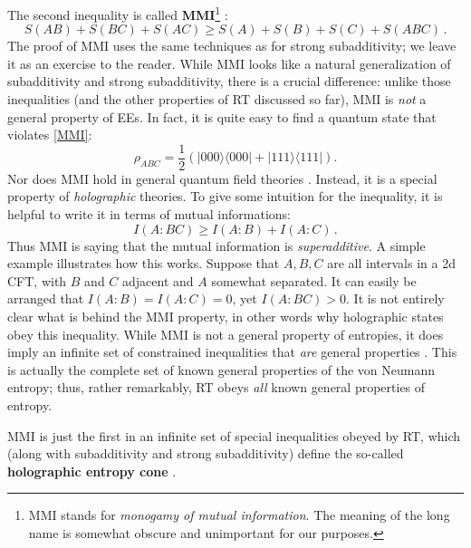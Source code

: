 \documentclass[11pt]{article}
\newcommand{\ket}[1]{|{#1}\rangle}
\newcommand{\bra}[1]{\langle{#1}|}
\begin{document}
The second inequality is called \textbf{MMI}\footnote{MMI stands for \emph{monogamy of mutual information}. The meaning of the long name is somewhat obscure and unimportant for our purposes.} \cite{Hayden:2011ag}:
\begin{equation}\label{MMI}
S(AB)+S(BC)+S(AC)\ge S(A)+S(B)+S(C)+S(ABC)\,.
\end{equation}
The proof of MMI uses the same techniques as for strong subadditivity; we leave it as an exercise to the reader. While MMI looks like a natural generalization of subadditivity and strong subadditivity, there is a crucial difference: unlike those inequalities (and the other properties of RT discussed so far), MMI is \emph{not} a general property of EEs. In fact, it is quite easy to find a quantum state that violates \eqref{MMI}:
\begin{equation}
\rho_{ABC} = \frac12\left(\ket{000}\bra{000}+\ket{111}\bra{111}\right).
\end{equation}
Nor does MMI hold in general quantum field theories \cite{Casini:2008wt}. Instead, it is a special property of \emph{holographic} theories. To give some intuition for the inequality, it is helpful to write it in terms of mutual informations:
\begin{equation}
I(A:BC)\ge I(A:B)+I(A:C)\,.
\end{equation}
Thus MMI is saying that the mutual information is \emph{superadditive}. A simple example illustrates how this works. Suppose that $A,B,C$ are all intervals in a 2d CFT, with $B$ and $C$ adjacent and $A$ somewhat separated. It can easily be arranged that $I(A:B)=I(A:C)=0$, yet $I(A:BC)>0$. It is not entirely clear what is behind the MMI property, in other words why holographic states obey this inequality. While MMI is not a general property of entropies, it does imply an infinite set of constrained inequalities that \emph{are} general properties \cite{Cadney2011}. This is actually the complete set of known general properties of the von Neumann entropy; thus, rather remarkably, RT obeys \emph{all} known general properties of entropy.

MMI is just the first in an infinite set of special inequalities obeyed by RT, which (along with subadditivity and strong subadditivity) define the so-called \textbf{holographic entropy cone} \cite{Bao:2015bfa}.







\end{document}

